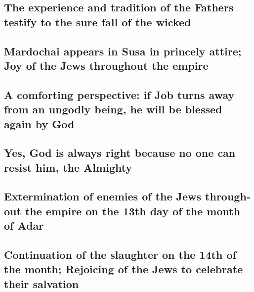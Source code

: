 \begin{paracol}{2}
\begin{otherlanguage}{english}
\hypertarget{the-experience-and-tradition-of-the-fathers-testify-to-the-sure-fall-of-the-wicked}{%
\subsection{The experience and tradition of the Fathers testify to the
sure fall of the
wicked}\label{the-experience-and-tradition-of-the-fathers-testify-to-the-sure-fall-of-the-wicked}}

\hypertarget{mardochai-appears-in-susa-in-princely-attire-joy-of-the-jews-throughout-the-empire}{%
\subsection{Mardochai appears in Susa in princely attire; Joy of the
Jews throughout the
empire}\label{mardochai-appears-in-susa-in-princely-attire-joy-of-the-jews-throughout-the-empire}}

\hypertarget{a-comforting-perspective-if-job-turns-away-from-an-ungodly-being-he-will-be-blessed-again-by-god}{%
\subsection{A comforting perspective: if Job turns away from an ungodly
being, he will be blessed again by
God}\label{a-comforting-perspective-if-job-turns-away-from-an-ungodly-being-he-will-be-blessed-again-by-god}}

\hypertarget{yes-god-is-always-right-because-no-one-can-resist-him-the-almighty}{%
\subsection{Yes, God is always right because no one can resist him, the
Almighty}\label{yes-god-is-always-right-because-no-one-can-resist-him-the-almighty}}

\hypertarget{extermination-of-enemies-of-the-jews-throughout-the-empire-on-the-13th-day-of-the-month-of-adar}{%
\subsection{Extermination of enemies of the Jews throughout the empire
on the 13th day of the month of
Adar}\label{extermination-of-enemies-of-the-jews-throughout-the-empire-on-the-13th-day-of-the-month-of-adar}}

\hypertarget{continuation-of-the-slaughter-on-the-14th-of-the-month-rejoicing-of-the-jews-to-celebrate-their-salvation}{%
\subsection{Continuation of the slaughter on the 14th of the month;
Rejoicing of the Jews to celebrate their
salvation}\label{continuation-of-the-slaughter-on-the-14th-of-the-month-rejoicing-of-the-jews-to-celebrate-their-salvation}}


\end{otherlanguage}
\end{paracol}
